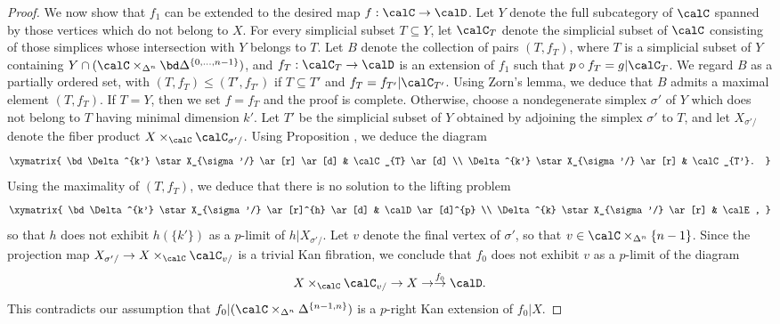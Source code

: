 \begin{proof}
We now show that $f_{1}$ can be extended to the desired map $f: \calC \rightarrow \calD$.
Let $Y$ denote the full subcategory of $\calC$ spanned by those vertices which do not belong to $X$.
For every simplicial subset $T \subseteq Y$, let $\calC_{T}$ denote the simplicial subset
of $\calC$ consisting of those simplices whose intersection with $Y$ belongs to $T$.
Let $B$ denote the collection of pairs $(T, f_{T})$, where $T$ is a simplicial subset of
$Y$ containing $Y \cap ( \calC \times_{ \Delta^n} \bd \Delta^{ \{0, \ldots, n-1 \}})$, and
$f_{T}: \calC_{T} \rightarrow \calD$ is an extension of $f_{1}$ such that
$p \circ f_{T} = g| \calC_{T}$. We regard $B$ as a partially ordered set, with $(T, f_{T}) \leq (T', f_{T'})$ if $T \subseteq T'$
and $f_{T} = f_{T'} | \calC_{T'}$. Using Zorn's lemma, we deduce that $B$ admits a maximal element
$(T, f_T)$. If $T = Y$, then we set $f = f_{T}$ and the proof is complete. Otherwise, choose a nondegenerate simplex $\sigma'$ of $Y$ which does not belong to $T$ having minimal dimension $k'$.
Let $T'$ be the simplicial subset of $Y$ obtained
by adjoining the simplex $\sigma'$ to $T$, and let $X_{\sigma'/}$ denote the fiber product
$X \times_{ \calC} \calC_{\sigma'/}$. Using Proposition , we deduce the diagram
$$ \xymatrix{ \bd \Delta^{k'} \star X_{\sigma'/} \ar[r] \ar[d] & \calC_{T} \ar[d] \\
\Delta^{k'} \star X_{\sigma'/} \ar[r] & \calC_{T'}. }$$
Using the maximality of $(T, f_{T})$, we deduce that there is no solution to the lifting problem
$$ \xymatrix{ \bd \Delta^{k'} \star X_{\sigma'/} \ar[r]^{h} \ar[d] & \calD \ar[d]^{p} \\
\Delta^{k} \star X_{\sigma'/} \ar[r] & \calE, }$$
so that $h$ does not exhibit $h( \{k' \})$ as a $p$-limit of $h | X_{\sigma'/}$. 
Let $v$ denote the final vertex of $\sigma'$, so that $v \in \calC \times_{ \Delta^n} \{n-1\}$.
Since the projection map $X_{\sigma'/} \rightarrow X \times_{ \calC} \calC_{v/}$ is a trivial
Kan fibration, we conclude that $f_0$ does not exhibit $v$ as a $p$-limit of the diagram
$$X \times_{\calC} \calC_{v/} \rightarrow X \rightarrow \stackrel{f_0}{\rightarrow} \calD.$$
This contradicts our assumption that 
$f_0|(\calC \times_{ \Delta^n} \Delta^{ \{n-1, n\}})$ is a $p$-right Kan extension
of $f_0 |X$. 
\end{proof}


